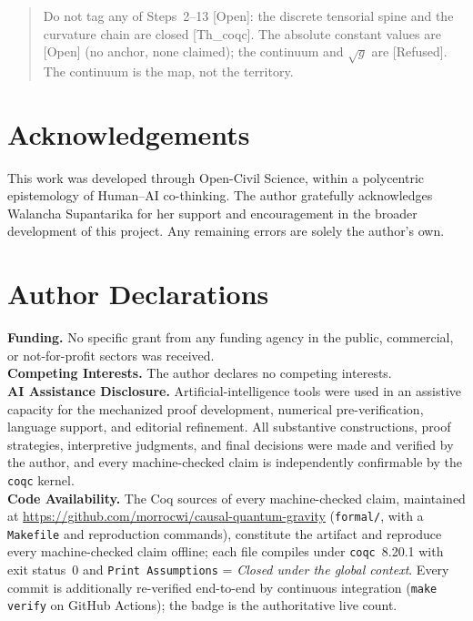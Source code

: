 \documentclass[10pt,twocolumn]{article}
\theoremstyle{definition}
\newcommand{\Thq}{\textsf{[Th\_coqc]}}   %
\newcommand{\Open}{\textsf{[Open]}}      %
\newcommand{\Refu}{\textsf{[Refused]}}    %
\newcommand{\code}[1]{\texttt{#1}}
\begin{document}
\begin{quote}\small
Do not tag any of Steps~2--13 \Open{}: the discrete tensorial spine and the
curvature chain are closed \Thq{}. The absolute constant values are \Open{} (no
anchor, none claimed); the continuum and $\sqrt{g}$ are \Refu{}. The continuum is
the map, not the territory.
\end{quote}

\section*{Acknowledgements}
This work was developed through Open-Civil Science, within a polycentric epistemology of
Human--AI co-thinking. The author gratefully acknowledges Walancha Supantarika for her
support and encouragement in the broader development of this project. Any remaining errors are
solely the author's own.

\section*{Author Declarations}
\textbf{Funding.} No specific grant from any funding agency in the public, commercial, or
not-for-profit sectors was received.\\[0.25em]
\textbf{Competing Interests.} The author declares no competing interests.\\[0.25em]
\textbf{AI Assistance Disclosure.} Artificial-intelligence tools were used in an assistive
capacity for the mechanized proof development, numerical pre-verification, language support,
and editorial refinement. All substantive constructions, proof strategies, interpretive
judgments, and final decisions were made and verified by the author, and every machine-checked
claim is independently confirmable by the \code{coqc} kernel.\\[0.25em]
\textbf{Code Availability.} The Coq sources of every machine-checked claim, maintained at
\url{https://github.com/morrocwi/causal-quantum-gravity} (\code{formal/}, with a \code{Makefile}
and reproduction commands), constitute the artifact and reproduce every machine-checked claim
offline; each file compiles under \code{coqc}~8.20.1 with exit status~0 and
\code{Print Assumptions} = \emph{Closed under the global context}. Every commit is additionally
re-verified end-to-end by continuous integration (\code{make verify} on GitHub Actions); the
badge is the authoritative live count.



\end{document}
